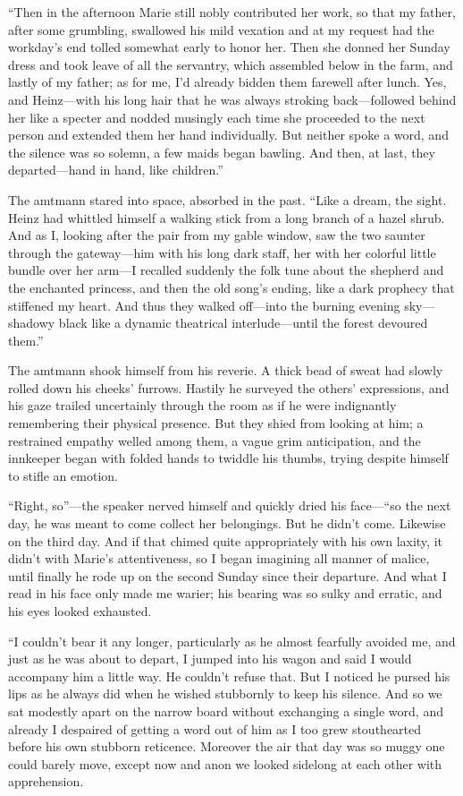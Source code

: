 \documentclass[12pt,a4paper]{article}
\begin{document}
“Then in the afternoon Marie still nobly contributed her work, so that my father, after some grumbling, swallowed his mild vexation and at my request had the workday’s end tolled somewhat early to honor her. Then she donned her Sunday dress and took leave of all the servantry, which assembled below in the farm, and lastly of my father; as for me, I’d already bidden them farewell after lunch. Yes, and Heinz—with his long hair that he was always stroking back—followed behind her like a specter and nodded musingly each time she proceeded to the next person and extended them her hand individually. But neither spoke a word, and the silence was so solemn, a few maids began bawling. And then, at last, they departed—hand in hand, like children.”

The amtmann stared into space, absorbed in the past. “Like a dream, the sight. Heinz had whittled himself a walking stick from a long branch of a hazel shrub. And as I, looking after the pair from my gable window, saw the two saunter through the gateway—him with his long dark staff, her with her colorful little bundle over her arm—I recalled suddenly the folk tune about the shepherd and the enchanted princess, and then the old song’s ending, like a dark prophecy that stiffened my heart. And thus they walked off—into the burning evening sky—shadowy black like a dynamic theatrical interlude—until the forest devoured them.”

The amtmann shook himself from his reverie. A thick bead of sweat had slowly rolled down his cheeks’ furrows. Hastily he surveyed the others’ expressions, and his gaze trailed uncertainly through the room as if he were indignantly remembering their physical presence. But they shied from looking at him; a restrained empathy welled among them, a vague grim anticipation, and the innkeeper began with folded hands to twiddle his thumbs, trying despite himself to stifle an emotion.

“Right, so”—the speaker nerved himself and quickly dried his face—“so the next day, he was meant to come collect her belongings. But he didn’t come. Likewise on the third day. And if that chimed quite appropriately with his own laxity, it didn’t with Marie’s attentiveness, so I began imagining all manner of malice, until finally he rode up on the second Sunday since their departure. And what I read in his face only made me warier; his bearing was so sulky and erratic, and his eyes looked exhausted.

“I couldn’t bear it any longer, particularly as he almost fearfully avoided me, and just as he was about to depart, I jumped into his wagon and said I would accompany him a little way. He couldn’t refuse that. But I noticed he pursed his lips as he always did when he wished stubbornly to keep his silence. And so we sat modestly apart on the narrow board without exchanging a single word, and already I despaired of getting a word out of him as I too grew stouthearted before his own stubborn reticence. Moreover the air that day was so muggy one could barely move, except now and anon we looked sidelong at each other with apprehension.
\end{document}
